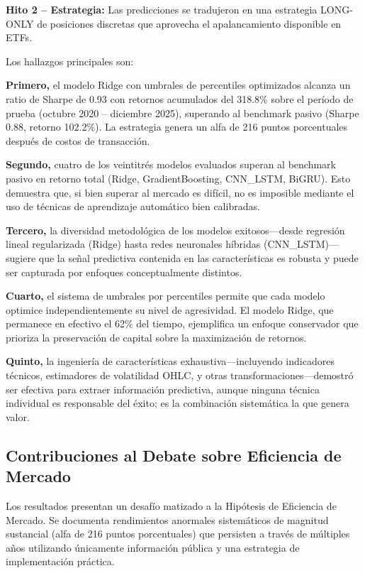 \documentclass[11pt,a4paper]{article}
\begin{document}
\textbf{Hito 2 -- Estrategia:} Las predicciones se tradujeron en una estrategia LONG-ONLY de posiciones discretas que aprovecha el apalancamiento disponible en ETFs.

Los hallazgos principales son:

\textbf{Primero,} el modelo Ridge con umbrales de percentiles optimizados alcanza un ratio de Sharpe de 0.93 con retornos acumulados del 318.8\% sobre el período de prueba (octubre 2020 -- diciembre 2025), superando al benchmark pasivo (Sharpe 0.88, retorno 102.2\%). La estrategia genera un alfa de 216 puntos porcentuales después de costos de transacción.

\textbf{Segundo,} cuatro de los veintitrés modelos evaluados superan al benchmark pasivo en retorno total (Ridge, GradientBoosting, CNN\_LSTM, BiGRU). Esto demuestra que, si bien superar al mercado es difícil, no es imposible mediante el uso de técnicas de aprendizaje automático bien calibradas.

\textbf{Tercero,} la diversidad metodológica de los modelos exitosos---desde regresión lineal regularizada (Ridge) hasta redes neuronales híbridas (CNN\_LSTM)---sugiere que la señal predictiva contenida en las características es robusta y puede ser capturada por enfoques conceptualmente distintos.

\textbf{Cuarto,} el sistema de umbrales por percentiles permite que cada modelo optimice independientemente su nivel de agresividad. El modelo Ridge, que permanece en efectivo el 62\% del tiempo, ejemplifica un enfoque conservador que prioriza la preservación de capital sobre la maximización de retornos.

\textbf{Quinto,} la ingeniería de características exhaustiva---incluyendo indicadores técnicos, estimadores de volatilidad OHLC, y otras transformaciones---demostró ser efectiva para extraer información predictiva, aunque ninguna técnica individual es responsable del éxito; es la combinación sistemática la que genera valor.

\subsection{Contribuciones al Debate sobre Eficiencia de Mercado}

Los resultados presentan un desafío matizado a la Hipótesis de Eficiencia de Mercado. Se documenta rendimientos anormales sistemáticos de magnitud sustancial (alfa de 216 puntos porcentuales) que persisten a través de múltiples años utilizando únicamente información pública y una estrategia de implementación práctica.
\end{document}
